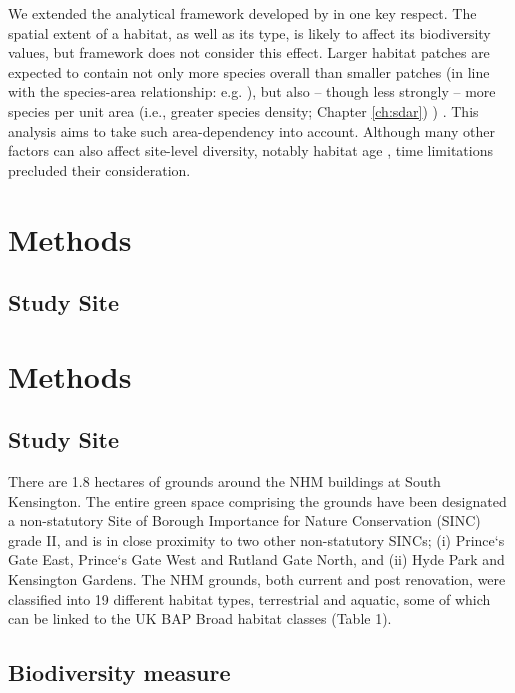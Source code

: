 We extended the analytical framework developed by \cite{Newbold:2015nat} in one key respect. The spatial extent of a habitat, as well as its type, is likely to affect its biodiversity values, but \cite{Newbold:2015nat} framework does not consider this effect.  Larger habitat patches are expected to contain not only more species overall than smaller patches (in line with the species-area relationship: e.g. \citealt{rosenzweig:1995species}), but also -- though less strongly -- more species per unit area (i.e., greater species density; 
\ifappendixStyle %
Chapter \ref{ch:sdar})%
\else
\citealt{Phillips:2015sdar})
\fi
. This analysis aims to take such area-dependency into account. Although many other factors can also affect site-level diversity, notably habitat age \citep{Sattler:2010le}, time limitations precluded their consideration.

\ifappendixStyle %
\section{Methods}
\subsection{Study Site}%
\else
\section*{Methods}
\subsection*{Study Site}
\fi

There are 1.8 hectares of grounds around the NHM buildings at South Kensington. The entire green space comprising the grounds have been designated a non-statutory Site of Borough Importance for Nature Conservation (SINC) grade II, and is in close proximity to two other non-statutory SINCs; (i) Prince`s Gate East, Prince`s Gate West and Rutland Gate North, and (ii) Hyde Park and Kensington Gardens. The NHM grounds, both current and post renovation, were classified into 19 different habitat types, terrestrial and aquatic, some of which can be linked to the UK BAP Broad habitat classes (Table 1).

\ifappendixStyle %
\subsection{Biodiversity measure}%
\else

